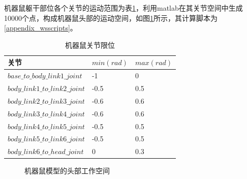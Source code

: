 机器鼠躯干部位各个关节的运动范围为表\ref{table_jointlimit}，利用matlab在其关节空间中生成10000个点，构成机器鼠头部的运动空间，如图\ref{figure_workenv}所示，其计算脚本为\ref{appendix_wsscripts}。
\begin{table}[htb]
  \linespread{1.5}
  \centering
  \caption{机器鼠关节限位}\label{table_jointlimit}
  \begin{tabular}{p{6cm}<{\centering\arraybackslash}p{2cm}<{\centering\arraybackslash} p{2cm}<{\centering\arraybackslash}}
    \toprule
    关节                                       &  $min(rad)$ & $max(rad)$  \\ \midrule
    $base\_to\_body\_link1\_joint$  &  -1  & 0  \\
    $body\_link1\_to\_link2\_joint$ &  -0.5  & 0.5 \\
    $body\_link2\_to\_link3\_joint$ &  -0.6 & 0.6   \\
    $body\_link3\_to\_link4\_joint$ &  -0.6 & 0.6 \\
    $body\_link4\_to\_link5\_joint$ &  -0.5 & 0.5 \\
    $body\_link5\_to\_link6\_joint$ &  -0.5 & 0.5 \\
    $body\_link6\_to\_head\_joint$  &  0 & 0.3 \\
    \bottomrule
    \end{tabular}
\end{table}
\begin{figure}[htbp]
  \centering
  \caption{机器鼠模型的头部工作空间}\label{figure_workenv}
\end{figure}

